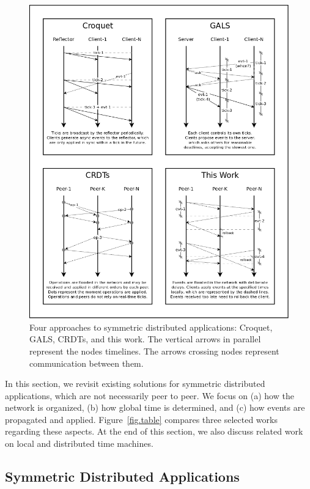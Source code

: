 \documentclass[10pt,journal,compsoc]{IEEEtran}
\begin{document}
\begin{figure}
  \centering
  \includegraphics[width=\linewidth]{algos}
  \caption{
    \label{fig.algos}
    Four approaches to symmetric distributed applications: Croquet, GALS,
    CRDTs, and this work.
    The vertical arrows in parallel represent the nodes timelines.
    The arrows crossing nodes represent communication between them.
  }
\end{figure}

In this section, we revisit existing solutions for symmetric distributed
applications, which are not necessarily peer to peer.
We focus on
    (a) how the network is organized,
    (b) how global time is determined, and
    (c) how events are propagated and applied.
Figure~\ref{fig.table} compares three selected works regarding these aspects.
%
At the end of this section, we also discuss related work on local and
distributed time machines.

\subsection{Symmetric Distributed Applications}
\end{document}
